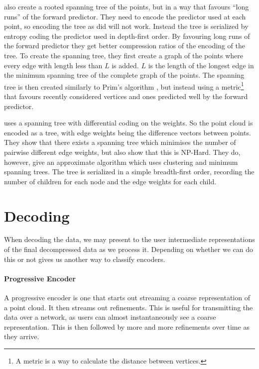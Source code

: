 \documentclass{report}
\begin{document}
\citep{merrycomp} also create a rooted spanning tree of the points, but in a
way that favours ``long runs'' of the forward predictor. They need to encode
the predictor used at each point, so encoding the tree as \citep{gumholdcomp}
did will not work. Instead the tree is serialized by entropy coding the
predictor used in depth-first order. By favouring long runs of the forward
predictor they get better compression ratios of the encoding of the tree. To
create the spanning tree, they first create a graph of the points where every
edge with length less than $L$ is added. $L$ is the length of the longest edge
in the minimum spanning tree of the complete graph of the points. The spanning
tree is then created similarly to Prim's algorithm \citep[p.\ 457]{sedgewick},
but instead using a metric\footnote{A metric is a way to calculate the
  distance between vertices.} that favours recently considered vertices and
ones predicted well by the forward predictor.

\citep{chen2005lcp} uses a spanning tree with differential coding on the
weights. So the point cloud is encoded as a tree, with edge weights being the
difference vectors between points. They show that there exists a spanning tree
which minimises the number of pairwise different edge weights, but also show
that this is NP-Hard. They do, however, give an approximate algorithm which
uses clustering and minimum spanning trees. The tree is serialized in a simple
breadth-first order, recording the number of children for each node and the
edge weights for each child.


\section{Decoding}

When decoding the data, we may present to the user intermediate
representations of the final decompressed data as we process it. Depending on
whether we can do this or not gives us another way to classify encoders.

\paragraph{Progressive Encoder}
A progressive encoder is one that starts out streaming a coarse representation
of a point cloud. It then streams out refinements. This is useful for
transmitting the data over a network, as users can almost instantaneously see
a coarse representation. This is then followed by more and more refinements
over time as they arrive.
\end{document}
